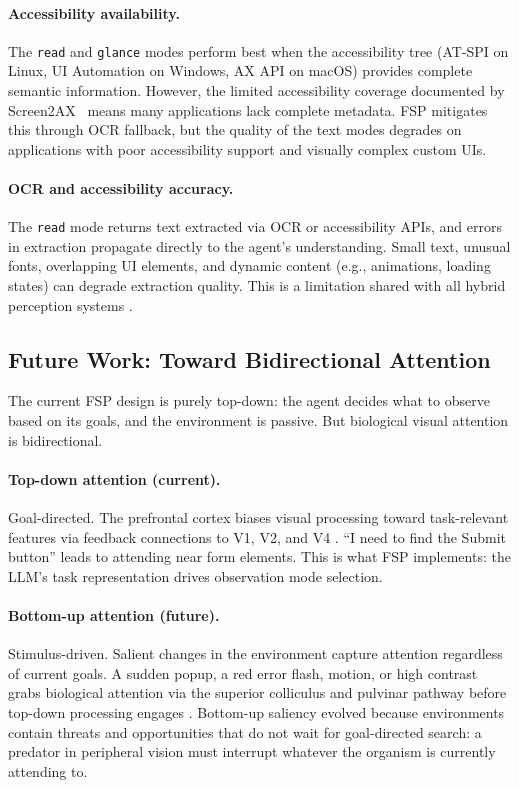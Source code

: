 \documentclass[11pt,a4paper]{article}
\begin{document}
\paragraph{Accessibility availability.}
The \texttt{read} and \texttt{glance} modes perform best when the accessibility tree (AT-SPI on Linux, UI Automation on Windows, AX API on macOS) provides complete semantic information. However, the limited accessibility coverage documented by Screen2AX~\cite{screen2ax} means many applications lack complete metadata. FSP mitigates this through OCR fallback, but the quality of the text modes degrades on applications with poor accessibility support and visually complex custom UIs.

\paragraph{OCR and accessibility accuracy.}
The \texttt{read} mode returns text extracted via OCR or accessibility APIs, and errors in extraction propagate directly to the agent's understanding. Small text, unusual fonts, overlapping UI elements, and dynamic content (e.g., animations, loading states) can degrade extraction quality. This is a limitation shared with all hybrid perception systems \cite{ufo2, agent-s2}.

\subsection{Future Work: Toward Bidirectional Attention}
\label{sec:future-bidirectional}

The current FSP design is purely top-down: the agent decides what to observe based on its goals, and the environment is passive. But biological visual attention is bidirectional.

\paragraph{Top-down attention (current).}
Goal-directed. The prefrontal cortex biases visual processing toward task-relevant features via feedback connections to V1, V2, and V4 \cite{desimone-duncan-attention, corbetta2002control}. ``I need to find the Submit button'' leads to attending near form elements. This is what FSP implements: the LLM's task representation drives observation mode selection.

\paragraph{Bottom-up attention (future).}
Stimulus-driven. Salient changes in the environment capture attention regardless of current goals. A sudden popup, a red error flash, motion, or high contrast grabs biological attention via the superior colliculus and pulvinar pathway before top-down processing engages \cite{itti-koch-saliency, theeuwes-capture}. Bottom-up saliency evolved because environments contain threats and opportunities that do not wait for goal-directed search: a predator in peripheral vision must interrupt whatever the organism is currently attending to.
\end{document}
